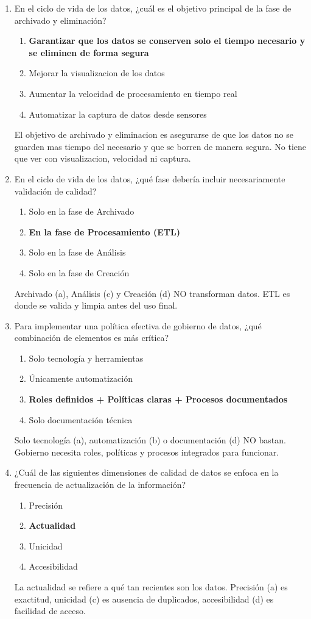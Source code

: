 \documentclass[12pt]{article}
\begin{document}
\begin{enumerate}[label=\arabic*.]
\item En el ciclo de vida de los datos, ¿cuál es el objetivo principal de la fase de archivado y eliminación?
\begin{enumerate}
    \item \textbf{Garantizar que los datos se conserven solo el tiempo necesario y se eliminen de forma segura}
    \item Mejorar la visualizacion de los datos
    \item Aumentar la velocidad de procesamiento en tiempo real
    \item Automatizar la captura de datos desde sensores
\end{enumerate}
El objetivo de archivado y eliminacion es asegurarse de que los datos no se guarden mas tiempo del necesario y que se borren de manera segura. No tiene que ver con visualizacion, velocidad ni captura.

\item En el ciclo de vida de los datos, ¿qué fase debería incluir necesariamente validación de calidad?
\begin{enumerate}
    \item Solo en la fase de Archivado
    \item \textbf{En la fase de Procesamiento (ETL)}
    \item Solo en la fase de Análisis
    \item Solo en la fase de Creación
\end{enumerate}
Archivado (a), Análisis (c) y Creación (d) NO transforman datos. ETL es donde se valida y limpia antes del uso final.

\item Para implementar una política efectiva de gobierno de datos, ¿qué combinación de elementos es más crítica?
\begin{enumerate}
    \item Solo tecnología y herramientas
    \item Únicamente automatización
    \item \textbf{Roles definidos + Políticas claras + Procesos documentados}
    \item Solo documentación técnica
\end{enumerate}
Solo tecnología (a), automatización (b) o documentación (d) NO bastan. Gobierno necesita roles, políticas y procesos integrados para funcionar.

\item ¿Cuál de las siguientes dimensiones de calidad de datos se enfoca en la frecuencia de actualización de la información?
\begin{enumerate}
    \item Precisión
    \item \textbf{Actualidad}
    \item Unicidad
    \item Accesibilidad
\end{enumerate}
La actualidad se refiere a qué tan recientes son los datos. Precisión (a) es exactitud, unicidad (c) es ausencia de duplicados, accesibilidad (d) es facilidad de acceso.


\end{enumerate}
\end{document}

